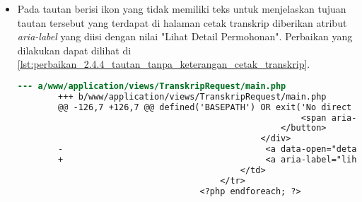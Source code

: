 \begin{itemize}
    \item Pada tautan berisi ikon yang tidak memiliki teks untuk menjelaskan tujuan tautan tersebut yang terdapat di halaman cetak transkrip diberikan atribut \textit{aria-label} yang diisi dengan nilai "Lihat Detail Permohonan". Perbaikan yang dilakukan dapat dilihat di \ref{lst:perbaikan_2.4.4_tautan_tanpa_keterangan_cetak_transkrip}.
    \begin{lstlisting}[frame=single, label={lst:perbaikan_2.4.4_tautan_tanpa_keterangan_cetak_transkrip}, language=diff, caption=Perbaikan Kriteria Sukses 2.4.4 - Tautan Tanpa Keterangan di Halaman Manajemen Cetak Transkrip]
        --- a/www/application/views/TranskripRequest/main.php
        +++ b/www/application/views/TranskripRequest/main.php
        @@ -126,7 +126,7 @@ defined('BASEPATH') OR exit('No direct script access allowed');
                                                        <span aria-hidden="true">&times;</span>
                                                    </button>
                                                </div>
        -                                        <a data-open="detail<?= $request->id ?>"><i class="fi-eye"></i></a>
        +                                        <a aria-label="lihat detail permohonan" data-open="detail<?= $request->id ?>"><i class="fi-eye"></i></a>
                                            </td>
                                        </tr>
                                    <?php endforeach; ?>
    \end{lstlisting}


\end{itemize}
